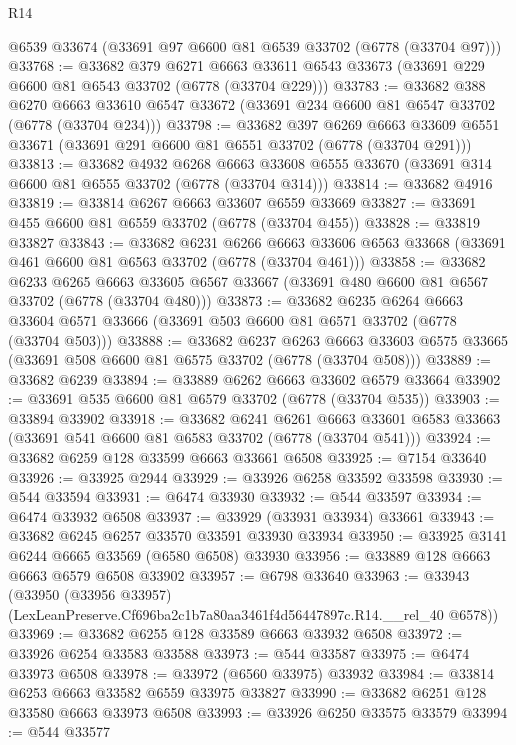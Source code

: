 \begin{lexlean}{R14}
\begin{coremodule}
    @6539
    @33674
    (@33691 @97 @6600 @81 @6539 @33702 (@6778 (@33704 @97)))
@33768 := @33682
    @379
    @6271
    @6663
    @33611
    @6543
    @33673
    (@33691 @229 @6600 @81 @6543 @33702 (@6778 (@33704 @229)))
@33783 := @33682
    @388
    @6270
    @6663
    @33610
    @6547
    @33672
    (@33691 @234 @6600 @81 @6547 @33702 (@6778 (@33704 @234)))
@33798 := @33682
    @397
    @6269
    @6663
    @33609
    @6551
    @33671
    (@33691 @291 @6600 @81 @6551 @33702 (@6778 (@33704 @291)))
@33813 := @33682
    @4932
    @6268
    @6663
    @33608
    @6555
    @33670
    (@33691 @314 @6600 @81 @6555 @33702 (@6778 (@33704 @314)))
@33814 := @33682 @4916
@33819 := @33814 @6267 @6663 @33607 @6559 @33669
@33827 := @33691 @455 @6600 @81 @6559 @33702 (@6778 (@33704 @455))
@33828 := @33819 @33827
@33843 := @33682
    @6231
    @6266
    @6663
    @33606
    @6563
    @33668
    (@33691 @461 @6600 @81 @6563 @33702 (@6778 (@33704 @461)))
@33858 := @33682
    @6233
    @6265
    @6663
    @33605
    @6567
    @33667
    (@33691 @480 @6600 @81 @6567 @33702 (@6778 (@33704 @480)))
@33873 := @33682
    @6235
    @6264
    @6663
    @33604
    @6571
    @33666
    (@33691 @503 @6600 @81 @6571 @33702 (@6778 (@33704 @503)))
@33888 := @33682
    @6237
    @6263
    @6663
    @33603
    @6575
    @33665
    (@33691 @508 @6600 @81 @6575 @33702 (@6778 (@33704 @508)))
@33889 := @33682 @6239
@33894 := @33889 @6262 @6663 @33602 @6579 @33664
@33902 := @33691 @535 @6600 @81 @6579 @33702 (@6778 (@33704 @535))
@33903 := @33894 @33902
@33918 := @33682
    @6241
    @6261
    @6663
    @33601
    @6583
    @33663
    (@33691 @541 @6600 @81 @6583 @33702 (@6778 (@33704 @541)))
@33924 := @33682 @6259 @128 @33599 @6663 @33661 @6508
@33925 := @7154 @33640
@33926 := @33925 @2944
@33929 := @33926 @6258 @33592 @33598
@33930 := @544 @33594
@33931 := @6474 @33930
@33932 := @544 @33597
@33934 := @6474 @33932 @6508
@33937 := @33929 (@33931 @33934) @33661
@33943 := @33682 @6245 @6257 @33570 @33591 @33930 @33934
@33950 := @33925 @3141 @6244 @6665 @33569 (@6580 @6508) @33930
@33956 := @33889 @128 @6663 @6663 @6579 @6508 @33902
@33957 := @6798 @33640
@33963 := @33943
    (@33950 (@33956 @33957) (LexLeanPreserve.Cf696ba2c1b7a80aa3461f4d56447897c.R14.__rel_40 @6578))
@33969 := @33682 @6255 @128 @33589 @6663 @33932 @6508
@33972 := @33926 @6254 @33583 @33588
@33973 := @544 @33587
@33975 := @6474 @33973 @6508
@33978 := @33972 (@6560 @33975) @33932
@33984 := @33814 @6253 @6663 @33582 @6559 @33975 @33827
@33990 := @33682 @6251 @128 @33580 @6663 @33973 @6508
@33993 := @33926 @6250 @33575 @33579
@33994 := @544 @33577

\end{coremodule}
\end{lexlean}
